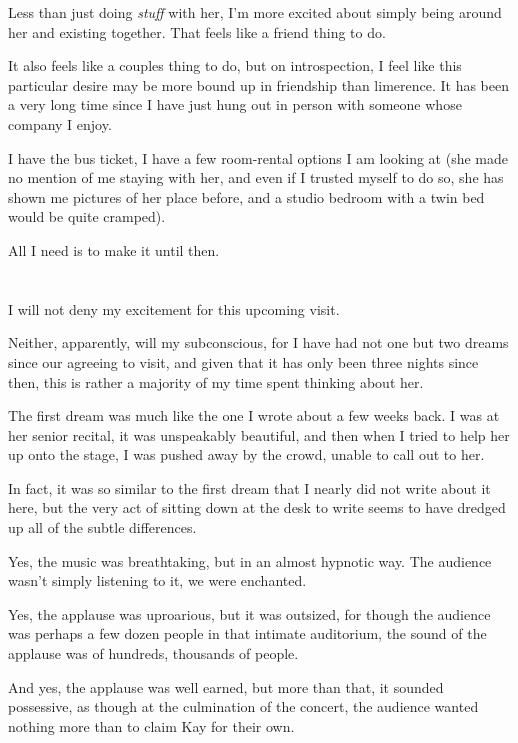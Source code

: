 Less than just doing \emph{stuff} with her, I'm more excited about simply being around her and existing together. That feels like a friend thing to do.

It also feels like a couples thing to do, but on introspection, I feel like this particular desire may be more bound up in friendship than limerence. It has been a very long time since I have just hung out in person with someone whose company I enjoy.

I have the bus ticket, I have a few room-rental options I am looking at (she made no mention of me staying with her, and even if I trusted myself to do so, she has shown me pictures of her place before, and a studio bedroom with a twin bed would be quite cramped).

All I need is to make it until then.

\section{}

I will not deny my excitement for this upcoming visit.

Neither, apparently, will my subconscious, for I have had not one but two dreams since our agreeing to visit, and given that it has only been three nights since then, this is rather a majority of my time spent thinking about her.

The first dream was much like the one I wrote about a few weeks back. I was at her senior recital, it was unspeakably beautiful, and then when I tried to help her up onto the stage, I was pushed away by the crowd, unable to call out to her.

In fact, it was so similar to the first dream that I nearly did not write about it here, but the very act of sitting down at the desk to write seems to have dredged up all of the subtle differences.

Yes, the music was breathtaking, but in an almost hypnotic way. The audience wasn't simply listening to it, we were enchanted.

Yes, the applause was uproarious, but it was outsized, for though the audience was perhaps a few dozen people in that intimate auditorium, the sound of the applause was of hundreds, thousands of people.

And yes, the applause was well earned, but more than that, it sounded possessive, as though at the culmination of the concert, the audience wanted nothing more than to claim Kay for their own.

